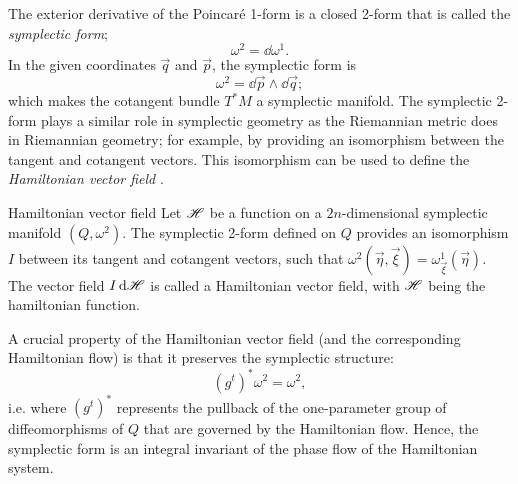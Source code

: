 The exterior derivative of the Poincaré 1-form is a closed 2-form that is called the \emph{symplectic form};
$$ \omega^2 = \dd{\omega^1}.$$
In the given coordinates $\vec{q}$ and $\vec{p}$, the symplectic form is 
$$ \omega^2 = \dd{\vec{p}}\wedge\dd{\vec{q}}; $$
which makes the cotangent bundle $T^*M$ a symplectic manifold. The symplectic 2-form plays a similar role in symplectic geometry as the Riemannian metric does in Riemannian geometry; for example, by providing an isomorphism between the tangent and cotangent vectors. This isomorphism can be used to define the \emph{Hamiltonian vector field} \cite{Arnold1989}.
\begin{thmblock}{Hamiltonian vector field}
    Let $\mathscr{H}$ be a function on a $2n$-dimensional symplectic manifold $(Q, \omega^2)$. The symplectic 2-form defined on $Q$ provides an isomorphism $I$ between its tangent and cotangent vectors, such that $\omega^2(\vec{\eta}, \vec{\xi}) = \omega^1_{\vec{\xi}}(\vec{\eta})$.  The vector field $I\dd{\ensuremath{\mathscr{H}}}$ is called a Hamiltonian vector field, with $\mathscr{H}$ being the hamiltonian function.
\end{thmblock}
A crucial property of the Hamiltonian vector field (and the corresponding Hamiltonian flow) is that it preserves the symplectic structure: \cite{Arnold1989}
$$ (g^t)^* \omega^2  = \omega^2, $$
i.e. where $(g^t)^*$ represents the pullback of the one-parameter group of diffeomorphisms of $Q$ that are governed by the Hamiltonian flow. Hence, the symplectic form is an integral invariant of the phase flow of the Hamiltonian system.  

